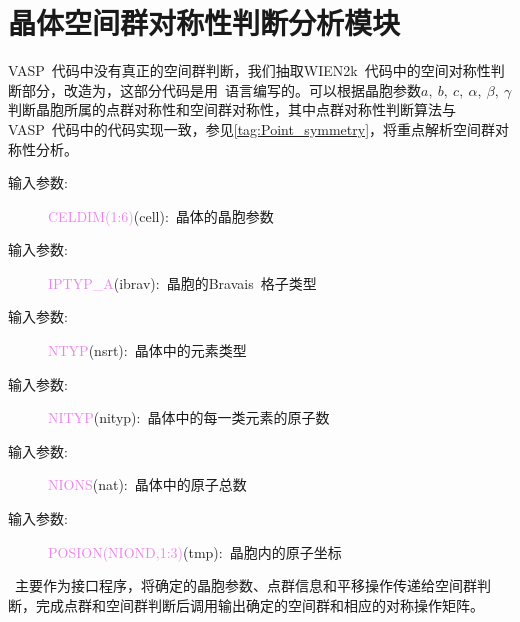 \documentclass{article}      %
\begin{document}
\section{晶体空间群对称性判断分析模块}
\textrm{VASP}~代码中没有真正的空间群判断，我们抽取\textrm{WIEN2k}~代码中的空间对称性判断部分，改造为，这部分代码是用~语言编写的。可以根据晶胞参数$a,~b,~c,~\alpha,~\beta,~\gamma$判断晶胞所属的点群对称性和空间群对称性，其中点群对称性判断算法与\textrm{VASP}~代码中的代码实现一致，参见\ref{tag:Point_symmetry}，将重点解析空间群对称性分析。

\begin{description}
	\item[输入参数:~]\textcolor{violet}{\textrm{CELDIM(1:6)}}(\textrm{cell}):~晶体的晶胞参数
	\item[输入参数:~]\textcolor{violet}{\textrm{IPTYP_A}}(\textrm{ibrav}):~晶胞的\textrm{Bravais~}格子类型
	\item[输入参数:~]\textcolor{violet}{\textrm{NTYP}}(\textrm{nsrt}):~晶体中的元素类型
	\item[输入参数:~]\textcolor{violet}{\textrm{NITYP}}(\textrm{nityp}):~晶体中的每一类元素的原子数
	\item[输入参数:~]\textcolor{violet}{\textrm{NIONS}}(\textrm{nat}):~晶体中的原子总数
	\item[输入参数:~]\textcolor{violet}{\textrm{POSION}(NIOND,1:3)}(\textrm{tmp}):~晶胞内的原子坐标
\end{description}
~主要作为接口程序，将确定的晶胞参数、点群信息和平移操作传递给空间群判断，完成点群和空间群判断后调用输出确定的空间群和相应的对称操作矩阵。
\end{document}
